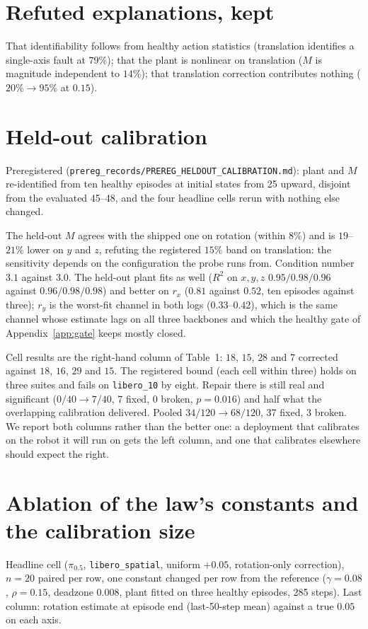 \documentclass{article}
\newcommand{\code}[1]{\texttt{\small #1}}
\begin{document}
\section{Refuted explanations, kept}
\label{app:refuted}
 That identifiability follows from healthy action
statistics (translation identifies a single-axis fault at $79\%$); that the plant is nonlinear
on translation ($M$ is magnitude independent to $14\%$); that translation correction
contributes nothing ($20\%\to95\%$ at $0.15$).

\section{Held-out calibration}
\label{app:heldout}
Preregistered (\code{prereg\_records/PREREG\_HELDOUT\_CALIBRATION.md}): plant and $M$
re-identified from ten healthy episodes at initial states from 25 upward, disjoint from the
evaluated 45--48, and the four headline cells rerun with nothing else changed.

The held-out $M$ agrees with the shipped one on rotation (within $8\%$) and is $19$--$21\%$
lower on $y$ and $z$, refuting the registered $15\%$ band on translation: the sensitivity
depends on the configuration the probe runs from. Condition number $3.1$ against $3.0$. The
held-out plant fits as well ($R^2$ on $x,y,z$ $0.95/0.98/0.96$ against $0.96/0.98/0.98$) and
better on $r_x$ ($0.81$ against $0.52$, ten episodes against three); $r_y$ is the worst-fit
channel in both logs ($0.33$--$0.42$), which is the same channel whose estimate lags on all
three backbones and which the healthy gate of Appendix~\ref{app:gate} keeps mostly closed.

Cell results are the right-hand column of Table~1: $18$, $15$, $28$ and $7$ corrected against
$18$, $16$, $29$ and $15$. The registered bound (each cell within three) holds on three suites
and fails on \code{libero\_10} by eight. Repair there is still real and significant ($0/40\to7/40$,
7 fixed, 0 broken, $p=0.016$) and half what the overlapping calibration delivered. Pooled
$34/120\to68/120$, 37 fixed, 3 broken. We report both columns rather than the better one: a
deployment that calibrates on the robot it will run on gets the left column, and one that
calibrates elsewhere should expect the right.

\section{Ablation of the law's constants and the calibration size}
\label{app:abl}
Headline cell ($\pi_{0.5}$, \code{libero\_spatial}, uniform $+0.05$, rotation-only
correction), $n=20$ paired per row, one constant changed per row from the reference
($\gamma=0.08$, $\rho=0.15$, deadzone $0.008$, plant fitted on three healthy episodes,
285 steps). Last column: rotation estimate at episode end (last-50-step mean) against a
true $0.05$ on each axis.
\end{document}
